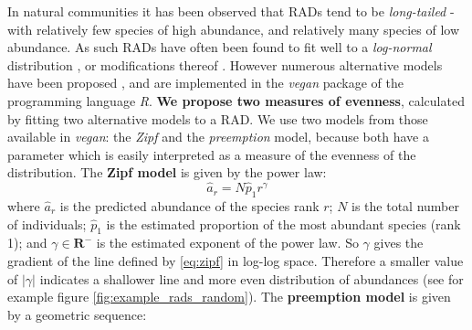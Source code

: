 In natural communities it has been observed that RADs tend to be \emph{long-tailed} - with relatively few species of high abundance, and relatively many species of low abundance. As such RADs have often been found to fit well to a \emph{log-normal} distribution \cite{lurgi2015effects,whittaker1965dominance}, or modifications thereof \cite{mcgill2007species}. However numerous alternative models have been proposed \cite{wilson1991methods}, and are implemented in the \emph{vegan} package \cite{oksanen2007vegan} of the programming language \emph{R}. \textbf{We propose two measures of evenness}, calculated by fitting two alternative models to a RAD. We use two models from those available in \emph{vegan}: the \emph{Zipf} and the \emph{preemption} model, because both have a parameter which is easily interpreted as a measure of the evenness of the distribution. The \textbf{Zipf model} is given by the power law: 
\begin{equation}
\hat{a}_r = N\hat{p}_1r^{\gamma}
\label{eq:zipf}
\end{equation}
%
where $\hat{a}_r$ is the predicted abundance of the species rank $r$; $N$ is the total number of individuals; $\hat{p}_1$ is the estimated proportion of the most abundant species (rank 1); and $\gamma \in \mathbf{R}^-$ is the estimated exponent of the power law. So $\gamma$ gives the gradient of the line defined by \eqref{eq:zipf} in log-log space. Therefore a smaller value of $\left| \gamma \right|$ indicates a shallower line and more even distribution of abundances (see for example figure \ref{fig:example_rads_random}). The \textbf{preemption model} is given by a geometric sequence:

